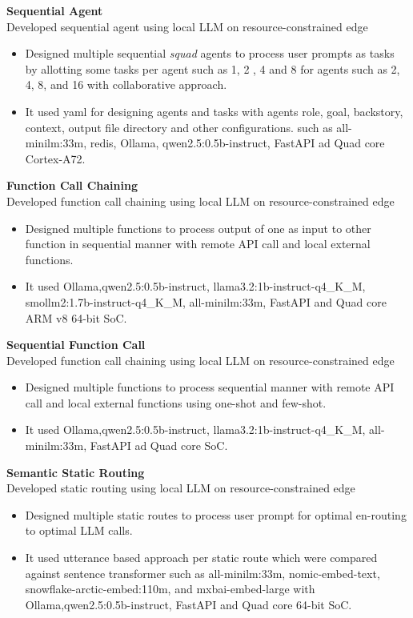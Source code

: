 \documentclass[10pt,a4paper]{article}
\begin{document}
	
	\textbf{Sequential Agent} \hfill \textit{}\\
	Developed sequential agent using local LLM on resource-constrained edge
	\begin{itemize}[leftmargin=0.2in]
		\item Designed multiple sequential \textit{squad} agents to process user prompts as tasks by allotting some tasks per agent such as 1, 2 , 4 and 8 for agents such as 2, 4, 8, and 16 with collaborative approach.
		\item It used yaml for designing agents and tasks with agents role, goal, backstory, context, output file directory and other configurations. such as all-minilm:33m, redis, Ollama, qwen2.5:0.5b-instruct, FastAPI ad Quad core Cortex-A72.
		
	\end{itemize}
	
	\textbf{Function Call Chaining} \hfill \textit{}\\
	Developed function call chaining using local LLM on resource-constrained edge
	\begin{itemize}[leftmargin=0.2in]
		\item Designed multiple functions to process output of one as input to other function in sequential manner with remote API call and local external functions.
		\item It used Ollama,qwen2.5:0.5b-instruct, llama3.2:1b-instruct-q4\_K\_M, smollm2:1.7b-instruct-q4\_K\_M, all-minilm:33m, FastAPI and Quad core ARM v8 64-bit SoC.
		
	\end{itemize}
	
	\textbf{Sequential Function Call} \hfill \textit{}\\
	Developed function call chaining using local LLM on resource-constrained edge
	\begin{itemize}[leftmargin=0.2in]
		\item Designed multiple functions to process sequential manner with remote API call and local external functions using one-shot and few-shot.
		\item It used Ollama,qwen2.5:0.5b-instruct, llama3.2:1b-instruct-q4\_K\_M, all-minilm:33m, FastAPI ad Quad core  SoC.
		
	\end{itemize}
	
	\textbf{Semantic Static Routing} \hfill \textit{}\\
	Developed static routing using local LLM on resource-constrained edge
	\begin{itemize}[leftmargin=0.2in]
		\item Designed multiple static routes to process user prompt for optimal en-routing to optimal LLM calls.
		\item It used utterance based approach per static route which were compared against sentence transformer such as all-minilm:33m, nomic-embed-text, snowflake-arctic-embed:110m, and mxbai-embed-large
		with Ollama,qwen2.5:0.5b-instruct, FastAPI and Quad core 64-bit SoC.
		
	\end{itemize}
	
\end{document}
